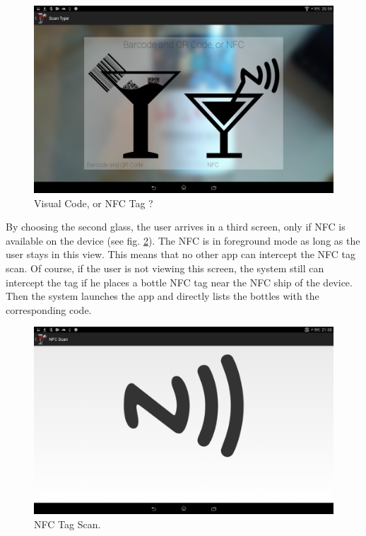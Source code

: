 \begin{figure}[H]
\begin{center}
	\includegraphics[width=\textwidth]{Images/ScanChoice.png}
	\caption{Visual Code, or NFC Tag ?}
	\label{scan_choice}
\end{center}
\end{figure}

By choosing the second glass, the user arrives in a third screen, only if NFC is available on the device (see fig. \ref{nfc_scan}). The NFC is in foreground mode as long as the user stays in this view. This means that no other app can intercept the NFC tag scan. Of course, if the user is not viewing this screen, the system still can intercept the tag if he places a bottle NFC tag near the NFC ship of the device. Then the system launches the app and directly lists the bottles with the corresponding code.

\begin{figure}[H]
\begin{center}
	\includegraphics[width=\textwidth]{Images/NFCReaderActivity.png}
	\caption{NFC Tag Scan.}
	\label{nfc_scan}
\end{center}
\end{figure}

